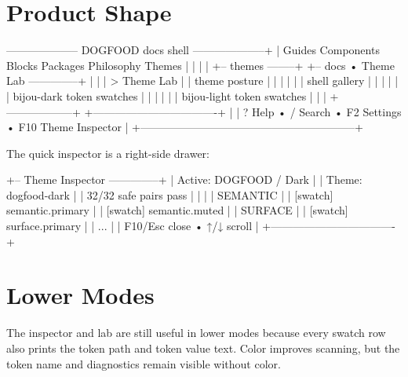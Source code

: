 \section{Product Shape}\label{record-179-product-shape}

\begin{CodeBlock}
-------------------- DOGFOOD docs shell --------------------+
| Guides  Components  Blocks  Packages  Philosophy  Themes  |
|                                                           |
| +-- themes --------+  +-- docs • Theme Lab --------------+ |
| | > Theme Lab      |  | theme posture                    | |
| |                  |  | shell gallery                    | |
| |                  |  | bijou-dark token swatches        | |
| |                  |  | bijou-light token swatches       | |
| +------------------+  +----------------------------------+ |
| ? Help • / Search • F2 Settings • F10 Theme Inspector     |
+-----------------------------------------------------------+
\end{CodeBlock}

The quick inspector is a right-side drawer:

\begin{CodeBlock}
                         +-- Theme Inspector --------------+
                         | Active: DOGFOOD / Dark          |
                         | Theme:  dogfood-dark            |
                         | 32/32 safe pairs pass           |
                         |                                  |
                         | SEMANTIC                        |
                         | [swatch] semantic.primary       |
                         | [swatch] semantic.muted         |
                         | SURFACE                         |
                         | [swatch] surface.primary        |
                         | ...                             |
                         | F10/Esc close • ↑/↓ scroll      |
                         +----------------------------------+
\end{CodeBlock}

\section{Lower Modes}\label{record-179-lower-modes}

The inspector and lab are still useful in lower modes because every swatch row also prints the token path and token value text. Color improves scanning, but the token name and diagnostics remain visible without color.

